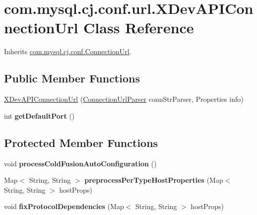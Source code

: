 \hypertarget{classcom_1_1mysql_1_1cj_1_1conf_1_1url_1_1_x_dev_a_p_i_connection_url}{}\section{com.\+mysql.\+cj.\+conf.\+url.\+X\+Dev\+A\+P\+I\+Connection\+Url Class Reference}
\label{classcom_1_1mysql_1_1cj_1_1conf_1_1url_1_1_x_dev_a_p_i_connection_url}


Inherits \mbox{\hyperlink{classcom_1_1mysql_1_1cj_1_1conf_1_1_connection_url}{com.\+mysql.\+cj.\+conf.\+Connection\+Url}}.

\subsection*{Public Member Functions}
\begin{DoxyCompactItemize}
\item 
\mbox{\hyperlink{classcom_1_1mysql_1_1cj_1_1conf_1_1url_1_1_x_dev_a_p_i_connection_url_a81df74119f400043949eb96ebec792e0}{X\+Dev\+A\+P\+I\+Connection\+Url}} (\mbox{\hyperlink{classcom_1_1mysql_1_1cj_1_1conf_1_1_connection_url_parser}{Connection\+Url\+Parser}} conn\+Str\+Parser, Properties info)
\item 
\mbox{\label{classcom_1_1mysql_1_1cj_1_1conf_1_1url_1_1_x_dev_a_p_i_connection_url_aa04f1d1cab569006945ddfe93314a0de}} 
int {\bfseries get\+Default\+Port} ()
\end{DoxyCompactItemize}
\subsection*{Protected Member Functions}
\begin{DoxyCompactItemize}
\item 
\mbox{\label{classcom_1_1mysql_1_1cj_1_1conf_1_1url_1_1_x_dev_a_p_i_connection_url_af0d83e17264427f0a92e9b58531c5b5a}} 
void {\bfseries process\+Cold\+Fusion\+Auto\+Configuration} ()
\item 
\mbox{\label{classcom_1_1mysql_1_1cj_1_1conf_1_1url_1_1_x_dev_a_p_i_connection_url_a548bba93e1640c9943483458a49a3dd4}} 
Map$<$ String, String $>$ {\bfseries preprocess\+Per\+Type\+Host\+Properties} (Map$<$ String, String $>$ host\+Props)
\item 
\mbox{\label{classcom_1_1mysql_1_1cj_1_1conf_1_1url_1_1_x_dev_a_p_i_connection_url_a26ddac3fdb0a85e6f5dfb869bd218e52}} 
void {\bfseries fix\+Protocol\+Dependencies} (Map$<$ String, String $>$ host\+Props)
\end{DoxyCompactItemize}
